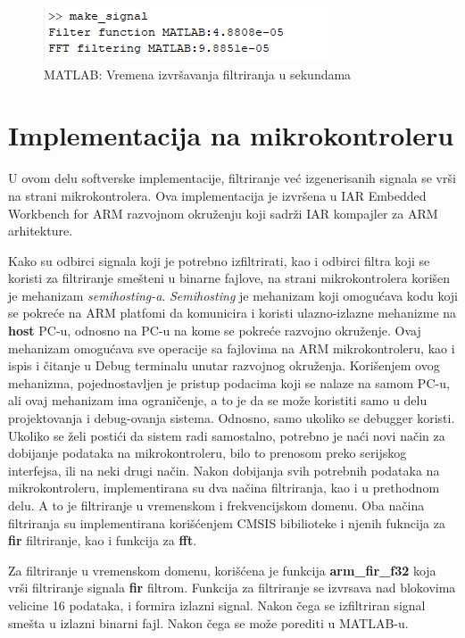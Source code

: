 \documentclass[a4paper,12pt, projekat]{etf}
\begin{document}
\begin{figure}[htb]
	\centering
	\includegraphics[scale=0.8]{matlab_times.png}
	\caption{MATLAB: Vremena izvr\v{s}avanja filtriranja u sekundama}
	\label{fig:matlabTimes}
\end{figure}

\section{Implementacija na mikrokontroleru}
U ovom delu softverske implementacije, filtriranje ve\'{c} izgenerisanih signala se vr\v{s}i na
strani mikrokontrolera. Ova implementacija je izvr\v{s}ena u IAR Embedded Workbench for ARM razvojnom
okru\v{z}enju koji sadr\v{z}i IAR kompajler za ARM arhitekture.

Kako su odbirci signala koji je potrebno izfiltrirati, kao i odbirci filtra koji se koristi za filtriranje
sme\v{s}teni u binarne fajlove, na strani mikrokontrolera kori\v{s}en je mehanizam \textit{semihosting-a}.
\textit{Semihosting} je mehanizam koji omogu\'{c}ava kodu koji se pokre\'{c}e na ARM platfomi da komunicira
i koristi ulazno-izlazne mehanizme na \textbf{host} PC-u, odnosno na PC-u na kome se pokre\'{c}e razvojno
okru\v{z}enje. Ovaj mehanizam omogu\'{c}ava sve operacije sa fajlovima na ARM mikrokontroleru, kao i ispis
i \v{c}itanje u Debug terminalu unutar razvojnog okru\v{z}enja. Kori\v{s}enjem ovog mehanizma, pojednostavljen
je pristup podacima koji se nalaze na samom PC-u, ali ovaj mehanizam ima ograni\v{c}enje, a to je da se mo\v{z}e
koristiti samo u delu projektovanja i debug-ovanja sistema. Odnosno, samo ukoliko se debugger koristi. Ukoliko
se \v{z}eli posti\'{c}i da sistem radi samostalno, potrebno je na\'{c}i novi na\v{c}in za dobijanje podataka na
mikrokontroleru, bilo to prenosom preko serijskog interfejsa, ili na neki drugi na\v{c}in.
Nakon dobijanja svih potrebnih podataka na mikrokontroleru, implementirana su dva na\v{c}ina filtriranja, kao i
u prethodnom delu. A to je filtriranje u vremenskom i frekvencijskom domenu. Oba na\v{c}ina filtriranja su
implementirana kori\v{s}\'{c}enjem CMSIS bibilioteke i njenih fukncija za \textbf{fir} filtriranje, kao i
funkcija za \textbf{fft}.

Za filtriranje u vremenskom domenu, kori\v{s}\'{c}ena je funkcija \textbf{arm\_fir\_f32} koja vr\v{s}i filtriranje
signala \textbf{fir} filtrom. Funkcija za filtriranje se izvrsava nad blokovima velicine 16 podataka, i formira
izlazni signal. Nakon \v{c}ega se izfiltriran signal sme\v{s}ta u izlazni binarni fajl. Nakon \v{c}ega se mo\v{z}e
porediti u MATLAB-u.
\end{document}
